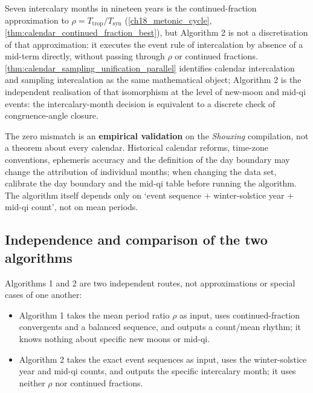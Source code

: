 \begin{remark}
\label{rem:exact_intercalation_sampling}
Seven intercalary months in nineteen years is the continued-fraction approximation to \(\rho=T_{\text{trop}}/T_{\text{syn}}\) (\cref{ch18_metonic_cycle}, \cref{thm:calendar_continued_fraction_best}), but Algorithm 2 is not a discretisation of that approximation: it executes the event rule of intercalation by absence of a mid-term directly, without passing through \(\rho\) or continued fractions. \cref{thm:calendar_sampling_unification_parallel} identifies calendar intercalation and sampling intercalation as the same mathematical object; Algorithm 2 is the independent realisation of that isomorphism at the level of new-moon and mid-qi events: the intercalary-month decision is equivalent to a discrete check of congruence-angle closure.
\end{remark}

\begin{remark}
\label{rem:exact_intercalation_scope}
The zero mismatch is an \textbf{empirical validation} on the \textit{Shouxing} compilation, not a theorem about every calendar. Historical calendar reforms, time-zone conventions, ephemeris accuracy and the definition of the day boundary may change the attribution of individual months; when changing the data set, calibrate the day boundary and the mid-qi table before running the algorithm. The algorithm itself depends only on `event sequence \(+\) winter-solstice year \(+\) mid-qi count', not on mean periods.
\end{remark}

\subsection{Independence and comparison of the two algorithms}
\label{subsec:two_intercalation_algorithms_comparison}

Algorithms 1 and 2 are two independent routes, not approximations or special cases of one another:

\begin{itemize}
    \item Algorithm 1 takes the mean period ratio \(\rho\) as input, uses continued-fraction convergents and a balanced sequence, and outputs a count/mean rhythm; it knows nothing about specific new moons or mid-qi.
    \item Algorithm 2 takes the exact event sequences as input, uses the winter-solstice year and mid-qi counts, and outputs the specific intercalary month; it uses neither \(\rho\) nor continued fractions.
\end{itemize}

